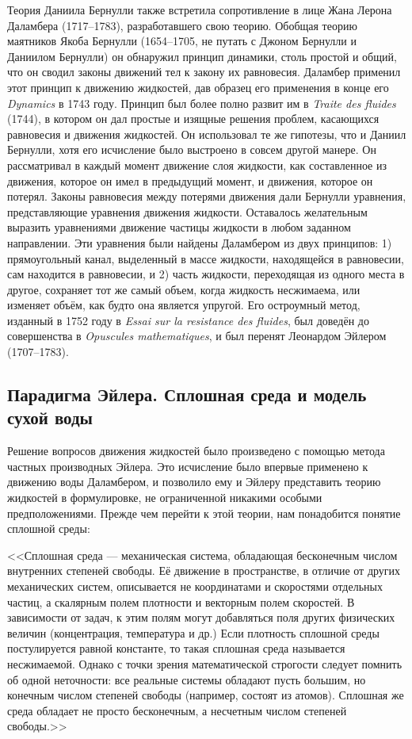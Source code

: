 Теория Даниила Бернулли также встретила сопротивление в лице Жана Лерона Даламбера (1717--1783), разработавшего свою теорию. Обобщая теорию маятников Якоба Бернулли (1654--1705, не путать с Джоном Бернулли и Даниилом Бернулли) он обнаружил принцип динамики, столь простой и общий, что он сводил законы движений тел к закону их равновесия. Даламбер применил этот принцип к движению жидкостей, дав образец его применения в конце его \textit{Dynamics} в 1743 году. Принцип был более полно развит им в \textit{Traite des fluides} (1744), в котором он дал простые и изящные решения проблем, касающихся равновесия и движения жидкостей. Он использовал те же гипотезы, что и Даниил Бернулли, хотя его исчисление было выстроено в совсем другой манере. Он рассматривал в каждый момент движение слоя жидкости, как составленное из движения, которое он имел в предыдущий момент, и движения, которое он потерял. Законы равновесия между потерями движения дали Бернулли уравнения, представляющие уравнения движения жидкости. Оставалось желательным выразить уравнениями движение частицы жидкости в любом заданном направлении. Эти уравнения были найдены Даламбером из двух принципов: 1) прямоугольный канал, выделенный в массе жидкости, находящейся в равновесии, сам находится в равновесии, и 2) часть жидкости, переходящая из одного места в другое, сохраняет тот же самый объем, когда жидкость несжимаема, или изменяет объём, как будто она является упругой. Его остроумный метод, изданный в 1752 году в \textit{Essai sur la resistance des fluides}, был доведён до совершенства в \textit{Opuscules mathematiques}, и был перенят Леонардом Эйлером (1707--1783).

\subsection*{Парадигма Эйлера. Сплошная среда и модель сухой воды}

Решение вопросов движения жидкостей было произведено с помощью метода частных производных Эйлера. Это исчисление было впервые применено к движению воды Даламбером, и позволило ему и Эйлеру представить теорию жидкостей в формулировке, не ограниченной никакими особыми предположениями. Прежде чем перейти к этой теории, нам понадобится понятие сплошной среды:

<<Сплошная среда — механическая система, обладающая бесконечным числом внутренних степеней свободы. Её движение в пространстве, в отличие от других механических систем, описывается не координатами и скоростями отдельных частиц, а скалярным полем плотности и векторным полем скоростей. В зависимости от задач, к этим полям могут добавляться поля других физических величин (концентрация, температура и др.) Если плотность сплошной среды постулируется равной константе, то такая сплошная среда называется несжимаемой. Однако с точки зрения математической строгости следует помнить об одной неточности: все реальные системы обладают пусть большим, но конечным числом степеней свободы (например, состоят из атомов). Сплошная же среда обладает не просто бесконечным, а несчетным числом степеней свободы.>>


